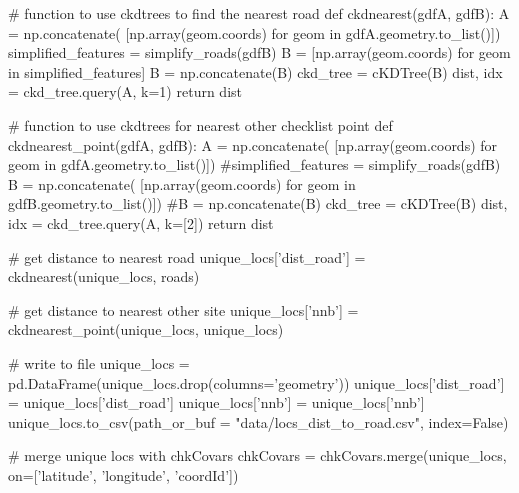 \documentclass[]{article}
\newenvironment{Shaded}{}{}
\newcommand{\CommentTok}[1]{\textcolor[rgb]{0.00,0.50,0.00}{#1}}
\newcommand{\ControlFlowTok}[1]{\textcolor[rgb]{0.00,0.00,1.00}{#1}}
\newcommand{\DecValTok}[1]{#1}
\newcommand{\KeywordTok}[1]{\textcolor[rgb]{0.00,0.00,1.00}{#1}}
\newcommand{\NormalTok}[1]{#1}
\newcommand{\OperatorTok}[1]{#1}
\newcommand{\StringTok}[1]{\textcolor[rgb]{0.00,0.50,0.50}{#1}}
\newcommand{\VariableTok}[1]{#1}
\begin{document}
\begin{Shaded}
\begin{Highlighting}[numbers=left,,]
\CommentTok{# function to use ckdtrees to find the nearest road}
\KeywordTok{def}\NormalTok{ ckdnearest(gdfA, gdfB):}
\NormalTok{    A }\OperatorTok{=}\NormalTok{ np.concatenate(}
\NormalTok{    [np.array(geom.coords) }\ControlFlowTok{for}\NormalTok{ geom }\KeywordTok{in}\NormalTok{ gdfA.geometry.to_list()])}
\NormalTok{    simplified_features }\OperatorTok{=}\NormalTok{ simplify_roads(gdfB)}
\NormalTok{    B }\OperatorTok{=}\NormalTok{ [np.array(geom.coords) }\ControlFlowTok{for}\NormalTok{ geom }\KeywordTok{in}\NormalTok{ simplified_features]}
\NormalTok{    B }\OperatorTok{=}\NormalTok{ np.concatenate(B)}
\NormalTok{    ckd_tree }\OperatorTok{=}\NormalTok{ cKDTree(B)}
\NormalTok{    dist, idx }\OperatorTok{=}\NormalTok{ ckd_tree.query(A, k}\OperatorTok{=}\DecValTok{1}\NormalTok{)}
    \ControlFlowTok{return}\NormalTok{ dist}

\CommentTok{# function to use ckdtrees for nearest other checklist point}
\KeywordTok{def}\NormalTok{ ckdnearest_point(gdfA, gdfB):}
\NormalTok{    A }\OperatorTok{=}\NormalTok{ np.concatenate(}
\NormalTok{    [np.array(geom.coords) }\ControlFlowTok{for}\NormalTok{ geom }\KeywordTok{in}\NormalTok{ gdfA.geometry.to_list()])}
    \CommentTok{#simplified_features = simplify_roads(gdfB)}
\NormalTok{    B }\OperatorTok{=}\NormalTok{ np.concatenate(}
\NormalTok{    [np.array(geom.coords) }\ControlFlowTok{for}\NormalTok{ geom }\KeywordTok{in}\NormalTok{ gdfB.geometry.to_list()])}
    \CommentTok{#B = np.concatenate(B)}
\NormalTok{    ckd_tree }\OperatorTok{=}\NormalTok{ cKDTree(B)}
\NormalTok{    dist, idx }\OperatorTok{=}\NormalTok{ ckd_tree.query(A, k}\OperatorTok{=}\NormalTok{[}\DecValTok{2}\NormalTok{])}
    \ControlFlowTok{return}\NormalTok{ dist}

\CommentTok{# get distance to nearest road}
\NormalTok{unique_locs[}\StringTok{'dist_road'}\NormalTok{] }\OperatorTok{=}\NormalTok{ ckdnearest(unique_locs, roads)}

\CommentTok{# get distance to nearest other site}
\NormalTok{unique_locs[}\StringTok{'nnb'}\NormalTok{] }\OperatorTok{=}\NormalTok{ ckdnearest_point(unique_locs, unique_locs)}

\CommentTok{# write to file}
\NormalTok{unique_locs }\OperatorTok{=}\NormalTok{ pd.DataFrame(unique_locs.drop(columns}\OperatorTok{=}\StringTok{'geometry'}\NormalTok{))}
\NormalTok{unique_locs[}\StringTok{'dist_road'}\NormalTok{] }\OperatorTok{=}\NormalTok{ unique_locs[}\StringTok{'dist_road'}\NormalTok{]}
\NormalTok{unique_locs[}\StringTok{'nnb'}\NormalTok{] }\OperatorTok{=}\NormalTok{ unique_locs[}\StringTok{'nnb'}\NormalTok{]}
\NormalTok{unique_locs.to_csv(path_or_buf }\OperatorTok{=} \StringTok{"data/locs_dist_to_road.csv"}\NormalTok{, index}\OperatorTok{=}\VariableTok{False}\NormalTok{)}

\CommentTok{# merge unique locs with chkCovars}
\NormalTok{chkCovars }\OperatorTok{=}\NormalTok{ chkCovars.merge(unique_locs, on}\OperatorTok{=}\NormalTok{[}\StringTok{'latitude'}\NormalTok{, }
                                             \StringTok{'longitude'}\NormalTok{, }\StringTok{'coordId'}\NormalTok{])}
\end{Highlighting}
\end{Shaded}
\end{document}
